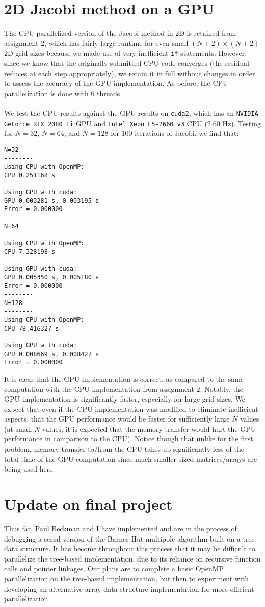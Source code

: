 \documentclass[10pt, letterpaper]{article}
\begin{document}
\section{2D Jacobi method on a GPU}
The CPU parallelized version of the Jacobi method in 2D is retained from assignment 2, which has fairly large runtime for even small $(N+2)\times(N+2)$ 2D grid sizes because we made use of very inefficient {\tt if} statements. However, since we know that the originally submitted CPU code converges (the residual reduces at each step appropriately), we retain it in full without changes in order to assess the accuracy of the GPU implementation. As before, the CPU parallelization is done with 6 threads.\\\\
We test the CPU results against the GPU results on {\tt cuda2}, which has an {\tt NVIDIA GeForce RTX 2080 Ti} GPU and {\tt Intel Xeon E5-2660 v3} CPU (2.60 Hz). Testing for $N=32$, $N=64$, and $N=128$ for 100 iterations of Jacobi, we find that:
\begin{verbatim}
N=32
--------
Using CPU with OpenMP:
CPU 0.251168 s

Using GPU with cuda:
GPU 0.003281 s, 0.003195 s
Error = 0.000000
--------
N=64
--------
Using CPU with OpenMP:
CPU 7.328198 s

Using GPU with cuda:
GPU 0.005350 s, 0.005180 s
Error = 0.000000
--------
N=128
--------
Using CPU with OpenMP:
CPU 78.416327 s

Using GPU with cuda:
GPU 0.008669 s, 0.008427 s
Error = 0.000000
\end{verbatim}
It is clear that the GPU implementation is correct, as compared to the same computation with the CPU implementation from assignment 2. Notably, the GPU implementation is significantly faster, especially for large grid sizes. We expect that even if the CPU implementation was modified to eliminate inefficient aspects, that the GPU performance would be faster for sufficiently large $N$ values (at small $N$ values, it is expected that the memory transfer would hurt the GPU performance in comparison to the CPU). Notice though that unlike for the first problem, memory transfer to/from the CPU takes up significantly less of the total time of the GPU computation since much smaller sized matrices/arrays are being used here.


\section{Update on final project}
Thus far, Paul Beckman and I have implemented and are in the process of debugging a serial version of the Barnes-Hut multipole algorithm built on a tree data structure. It has become throughout this process that it may be difficult to parallelize the tree-based implementation, due to its reliance on recursive function calls and pointer linkages. Our plans are to complete a basic OpenMP parallelization on the tree-based implementation, but then to experiment with developing an alternative array data structure implementation for more efficient parallelization.
\end{document}

